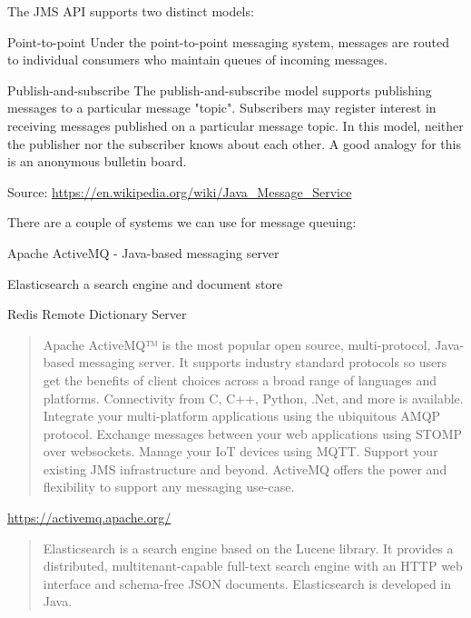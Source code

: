 \documentclass[Screen16to9,17pt]{foils}
\begin{document}

The JMS API supports two distinct models:

\begin{list2}
\item Point-to-point Under the point-to-point messaging system, messages are routed to individual consumers who maintain queues of incoming messages.

\item Publish-and-subscribe The publish-and-subscribe model supports publishing messages to a particular message "topic". Subscribers may register interest in receiving messages published on a particular message topic. In this model, neither the publisher nor the subscriber knows about each other. A good analogy for this is an anonymous bulletin board.

\end{list2}
Source: \url{https://en.wikipedia.org/wiki/Java_Message_Service}



There are a couple of systems we can use for message queuing:
\begin{list2}
\item Apache ActiveMQ -  Java-based messaging server
\item Elasticsearch a search engine and document store
\item Redis Remote Dictionary Server
\end{list2}


\begin{quote}
Apache ActiveMQ™ is the most popular open source, multi-protocol, Java-based messaging server. It supports industry standard protocols so users get the benefits of client choices across a broad range of languages and platforms. Connectivity from C, C++, Python, .Net, and more is available. Integrate your multi-platform applications using the ubiquitous AMQP protocol. Exchange messages between your web applications using STOMP over websockets. Manage your IoT devices using MQTT. Support your existing JMS infrastructure and beyond. ActiveMQ offers the power and flexibility to support any messaging use-case.
\end{quote}

\url{https://activemq.apache.org/}



\begin{quote}
Elasticsearch is a search engine based on the Lucene library. It provides a distributed, multitenant-capable full-text search engine with an HTTP web interface and schema-free JSON documents. Elasticsearch is developed in Java.
\end{quote}
\end{document}
